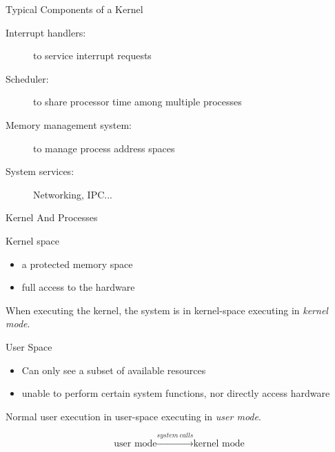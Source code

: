 \begin{frame}
  \begin{exampleblock}{Typical Components of a Kernel}
    \begin{description}
    \item[Interrupt handlers:] to service interrupt requests
    \item[Scheduler:] to share processor time among multiple processes
    \item[Memory management system:] to manage process address spaces
    \item[System services:] Networking, IPC...
    \end{description}
  \end{exampleblock}
\end{frame}

\begin{frame}{Kernel And Processes}
  \begin{exampleblock}{Kernel space}
    \begin{itemize}
    \item a protected memory space
    \item full access to the hardware
    \end{itemize}
    When executing the kernel, the system is in kernel-space executing in \emph{kernel
      mode}.
  \end{exampleblock}
  \begin{exampleblock}{User Space}
    \begin{itemize}
    \item Can only see a subset of available resources
    \item unable to perform certain system functions, nor directly access hardware
    \end{itemize}
    Normal user execution in user-space executing in \emph{user mode}.
  \end{exampleblock}
  $$\text{user mode} \xrightarrow{system\ calls} \text{kernel mode}$$
\end{frame}

\begin{frame}
  \begin{center}
     
  \end{center}
\end{frame}

